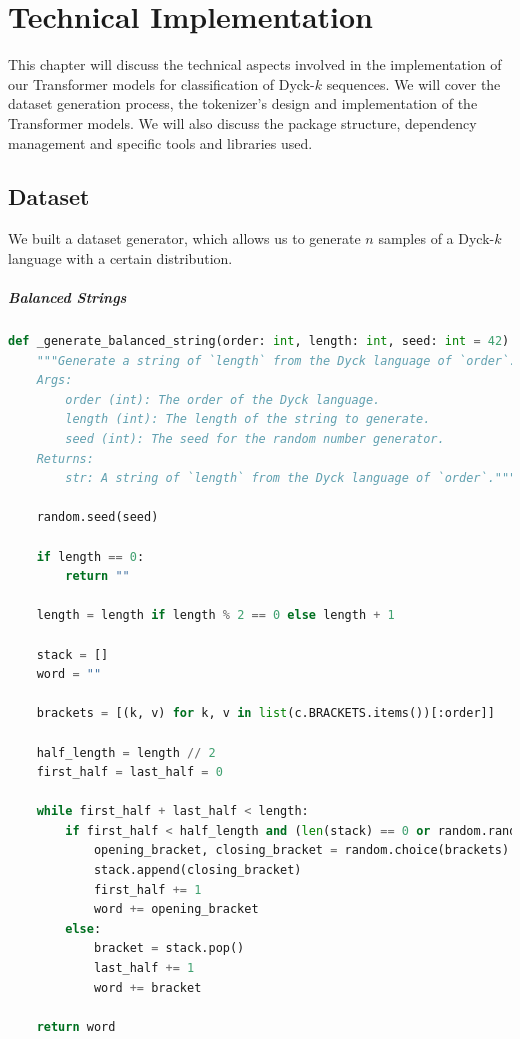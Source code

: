 \chapter{Technical Implementation}

This chapter will discuss the technical aspects involved in the implementation of our Transformer models for classification of Dyck-$k$ sequences. We will cover the dataset generation process, the tokenizer's design and implementation of the Transformer models. We will also discuss the package structure, dependency management and specific tools and libraries used.

\section{Dataset} \label{section:dataset}

We built a dataset generator, which allows us to generate $n$ samples of a Dyck-$k$ language with a certain distribution.

\paragraph{Balanced Strings}
\begin{lstlisting}[language=Python, caption=Generate balanced string, label=balanced_generator]
def _generate_balanced_string(order: int, length: int, seed: int = 42) -> str:
    """Generate a string of `length` from the Dyck language of `order`.
    Args:
        order (int): The order of the Dyck language.
        length (int): The length of the string to generate.
        seed (int): The seed for the random number generator.
    Returns:
        str: A string of `length` from the Dyck language of `order`."""
        
    random.seed(seed)
    
    if length == 0:
        return ""
        
    length = length if length % 2 == 0 else length + 1
    
    stack = []
    word = ""

    brackets = [(k, v) for k, v in list(c.BRACKETS.items())[:order]]

    half_length = length // 2
    first_half = last_half = 0

    while first_half + last_half < length:
        if first_half < half_length and (len(stack) == 0 or random.random() < 0.5):
            opening_bracket, closing_bracket = random.choice(brackets)
            stack.append(closing_bracket)
            first_half += 1
            word += opening_bracket
        else:
            bracket = stack.pop()
            last_half += 1
            word += bracket

    return word
\end{lstlisting}

